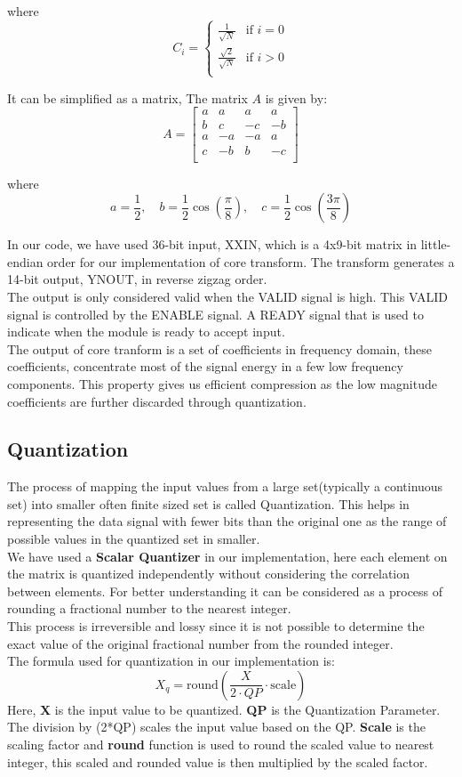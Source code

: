where
\[
C_i = \begin{cases} 
	\frac{1}{\sqrt{N}} & \text{if } i = 0 \\
	\frac{\sqrt{2}}{\sqrt{N}} & \text{if } i > 0 \\
\end{cases}
\]

It can be simplified as a matrix, The matrix $A$ is given by:
\[
A = \begin{bmatrix}
	a & a & a & a \\
	b & c & -c & -b \\
	a & -a & -a & a \\
	c & -b & b & -c \\
\end{bmatrix}
\]

where
\[
a = \frac{1}{2}, \quad
b = \frac{1}{2}\cos\left(\frac{\pi}{8}\right), \quad
c = \frac{1}{2}\cos\left(\frac{3\pi}{8}\right)
\]

In our code, we have used 36-bit input, XXIN, which is a 4x9-bit matrix in little-endian order for our implementation of core transform. The transform generates a 14-bit output, YNOUT, in reverse zigzag order.\\
The output is only considered valid when the VALID signal is high. This VALID signal is controlled by the ENABLE signal. A READY signal that is used to indicate when the module is ready to accept input.\\
The output of core tranform is a set of coefficients in frequency domain, these coefficients, concentrate most of the signal energy in a few low frequency components. This property gives us efficient compression as the low magnitude coefficients are further discarded through quantization.

\subsection{Quantization}
The process of mapping the input values from a large set(typically a continuous set) into smaller often finite sized set is called Quantization. This helps in representing the data signal with fewer bits than the original one as the range of possible values in the quantized set in smaller.\\
We have used a \textbf{Scalar Quantizer} in our implementation, here each element on the matrix is quantized independently without considering the correlation between elements. For better understanding it can be considered as a process of rounding a fractional number to the nearest integer.\\
This process is irreversible and lossy since it is not possible to determine the exact value of the original fractional number from the rounded integer.\\
The formula used for quantization in our implementation is:
\[
X_q = \text{round}\left(\frac{X}{{2 \cdot QP}} \cdot \text{scale}\right)
\]
Here, \textbf{X} is the input value to be quantized. \textbf{QP} is the Quantization Parameter. The division by (2*QP) scales the input value based on the QP. \textbf{Scale} is the scaling factor and \textbf{round} function is used to round the scaled value to nearest integer, this scaled and rounded value is then multiplied by the scaled factor.

